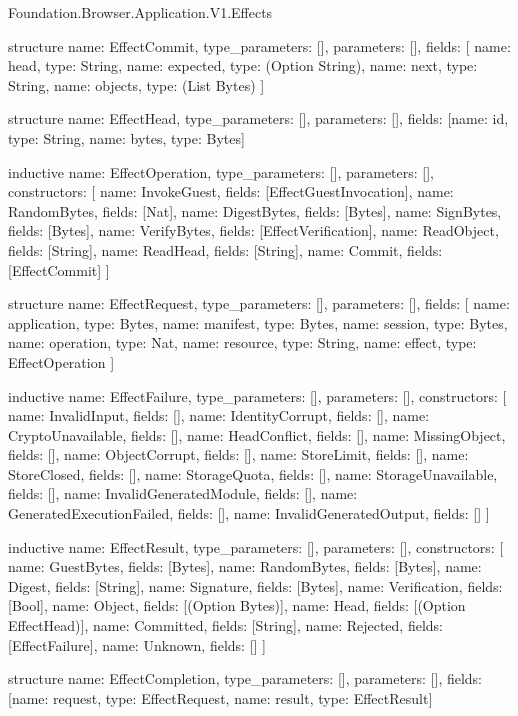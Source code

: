 \begin{lexlean}{Foundation.Browser.Application.V1.Effects}
\begin{semanticmodule}
structure{
  name: EffectCommit,
  type_parameters: [],
  parameters: [],
  fields: [
    {name: head, type: String},
    {name: expected, type: (Option String)},
    {name: next, type: String},
    {name: objects, type: (List Bytes)}
  ]
}

structure{
  name: EffectHead,
  type_parameters: [],
  parameters: [],
  fields: [{name: id, type: String}, {name: bytes, type: Bytes}]
}

inductive{
  name: EffectOperation,
  type_parameters: [],
  parameters: [],
  constructors: [
    {name: InvokeGuest, fields: [EffectGuestInvocation]},
    {name: RandomBytes, fields: [Nat]},
    {name: DigestBytes, fields: [Bytes]},
    {name: SignBytes, fields: [Bytes]},
    {name: VerifyBytes, fields: [EffectVerification]},
    {name: ReadObject, fields: [String]},
    {name: ReadHead, fields: [String]},
    {name: Commit, fields: [EffectCommit]}
  ]
}

structure{
  name: EffectRequest,
  type_parameters: [],
  parameters: [],
  fields: [
    {name: application, type: Bytes},
    {name: manifest, type: Bytes},
    {name: session, type: Bytes},
    {name: operation, type: Nat},
    {name: resource, type: String},
    {name: effect, type: EffectOperation}
  ]
}

inductive{
  name: EffectFailure,
  type_parameters: [],
  parameters: [],
  constructors: [
    {name: InvalidInput, fields: []},
    {name: IdentityCorrupt, fields: []},
    {name: CryptoUnavailable, fields: []},
    {name: HeadConflict, fields: []},
    {name: MissingObject, fields: []},
    {name: ObjectCorrupt, fields: []},
    {name: StoreLimit, fields: []},
    {name: StoreClosed, fields: []},
    {name: StorageQuota, fields: []},
    {name: StorageUnavailable, fields: []},
    {name: InvalidGeneratedModule, fields: []},
    {name: GeneratedExecutionFailed, fields: []},
    {name: InvalidGeneratedOutput, fields: []}
  ]
}

inductive{
  name: EffectResult,
  type_parameters: [],
  parameters: [],
  constructors: [
    {name: GuestBytes, fields: [Bytes]},
    {name: RandomBytes, fields: [Bytes]},
    {name: Digest, fields: [String]},
    {name: Signature, fields: [Bytes]},
    {name: Verification, fields: [Bool]},
    {name: Object, fields: [(Option Bytes)]},
    {name: Head, fields: [(Option EffectHead)]},
    {name: Committed, fields: [String]},
    {name: Rejected, fields: [EffectFailure]},
    {name: Unknown, fields: []}
  ]
}

structure{
  name: EffectCompletion,
  type_parameters: [],
  parameters: [],
  fields: [{name: request, type: EffectRequest}, {name: result, type: EffectResult}]
}


\end{semanticmodule}
\end{lexlean}
